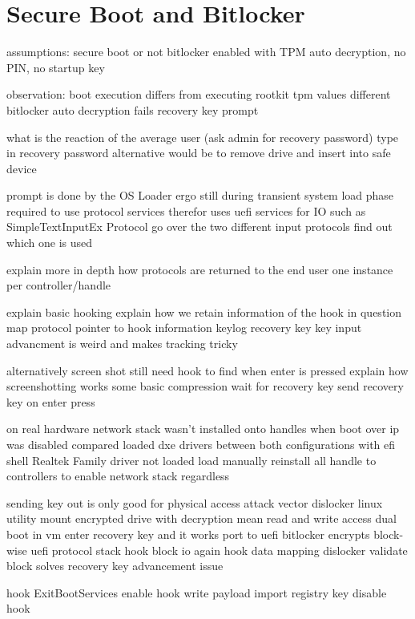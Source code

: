 \section{Secure Boot and Bitlocker}

assumptions:
secure boot or not
bitlocker enabled with TPM auto decryption, no PIN, no startup key

observation:
boot execution differs from executing rootkit
tpm values different
bitlocker auto decryption fails
recovery key prompt

what is the reaction of the average user
(ask admin for recovery password)
type in recovery password
alternative would be to remove drive and insert into safe device

prompt is done by the OS Loader
ergo still during transient system load phase
required to use protocol services
therefor uses uefi services for IO
such as SimpleTextInputEx Protocol
go over the two different input protocols
find out which one is used

explain more in depth how protocols are returned to the end user
one instance per controller/handle

explain basic hooking
explain how we retain information of the hook in question
map protocol pointer to hook information
keylog recovery key
key input advancment is weird and makes tracking tricky

alternatively screen shot
still need hook to find when enter is pressed
explain how screenshotting works
some basic compression
wait for recovery key
send recovery key on enter press

on real hardware
network stack wasn't installed onto handles when boot over ip was disabled
compared loaded dxe drivers between both configurations with efi shell
Realtek Family driver not loaded
load manually
reinstall all handle to controllers to enable network stack regardless

sending key out is only good for physical access attack vector
dislocker linux utility
\cite{dislocker}
mount encrypted drive with decryption mean
read and write access
dual boot in vm
enter recovery key and it works
port to uefi
bitlocker encrypts block-wise
uefi protocol stack
hook block io
again hook data mapping
dislocker validate block
solves recovery key advancement issue

hook ExitBootServices
enable hook
write payload
import registry key
disable hook

